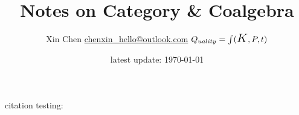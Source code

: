 \documentclass[12pt]{article} %
\title{Notes on Category \& Coalgebra}
\author{Xin Chen \qquad \href{mailto:chenxin_hello@outlook.com}{\textsf{chenxin\_hello@outlook.com}}  
	\qquad 
	$Q_{uality} = \int (\text{\Large $K$},P,t)$}
\date{latest update: \today}
\begin{document}
\maketitle
\tableofcontents


\medskip

citation testing: \cite{Smi2024,Lan2018,SEP-category}








\clearpage
\printbibliography
{}
\end{document}
